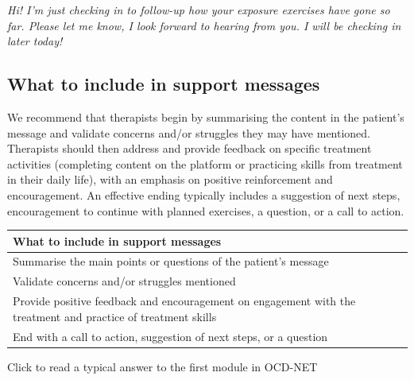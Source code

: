 \documentclass[]{book}
\theoremstyle{definition}
\theoremstyle{definition}
\theoremstyle{definition}
\theoremstyle{remark}
\begin{document}
\emph{Hi! I'm just checking in to follow-up how your exposure exercises
have gone so far. Please let me know, I look forward to hearing from
you. I will be checking in later today!}

\hypertarget{what-to-include-in-support-messages}{%
\subsection{What to include in support
messages}\label{what-to-include-in-support-messages}}

We recommend that therapists begin by summarising the content in the
patient's message and validate concerns and/or struggles they may have
mentioned. Therapists should then address and provide feedback on
specific treatment activities (completing content on the platform or
practicing skills from treatment in their daily life), with an emphasis
on positive reinforcement and encouragement. An effective ending
typically includes a suggestion of next steps, encouragement to continue
with planned exercises, a question, or a call to action.

\begin{longtable}[]{@{}l@{}}
\toprule
\begin{minipage}[b]{0.97\columnwidth}\raggedright
\textbf{What to include in support messages}\strut
\end{minipage}\tabularnewline
\midrule
\endhead
\begin{minipage}[t]{0.97\columnwidth}\raggedright
Summarise the main points or questions of the patient's message\strut
\end{minipage}\tabularnewline
\begin{minipage}[t]{0.97\columnwidth}\raggedright
Validate concerns and/or struggles mentioned\strut
\end{minipage}\tabularnewline
\begin{minipage}[t]{0.97\columnwidth}\raggedright
Provide positive feedback and encouragement on engagement with the
treatment and practice of treatment skills\strut
\end{minipage}\tabularnewline
\begin{minipage}[t]{0.97\columnwidth}\raggedright
End with a call to action, suggestion of next steps, or a question\strut
\end{minipage}\tabularnewline
\bottomrule
\end{longtable}

 Click to read a typical answer to the first module in OCD-NET
\end{document}
